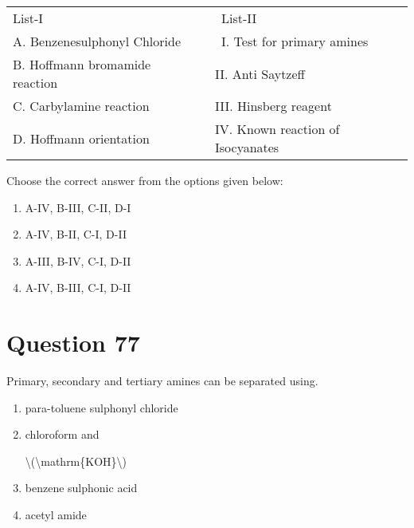 \documentclass{article}
\begin{document}
\begin{longtable}[]{@{}ll@{}}

\toprule\noalign{}

\endhead

\bottomrule\noalign{}

\endlastfoot

List-I~~ & ~List-II~ \\

A. Benzenesulphonyl Chloride & ~I. Test for primary amines~ \\

B. Hoffmann bromamide reaction~~ & II. Anti Saytzeff~~ \\

C. Carbylamine reaction~ & III. Hinsberg reagent~ \\

D. Hoffmann orientation~ & IV. Known reaction of Isocyanates~ \\

\end{longtable}



Choose the correct answer from the options given below:\\


\begin{enumerate}[label=(\alph*)]
\item A-IV, B-III, C-II, D-I


\item A-IV, B-II, C-I, D-II


\item A-III, B-IV, C-I, D-II


\item A-IV, B-III, C-I, D-II


\end{enumerate}
\newpage
\section*{Question 77}
Primary, secondary and tertiary amines can be separated using.


\begin{enumerate}[label=(\alph*)]
\item para-toluene sulphonyl chloride


\item chloroform and

\textbackslash(\textbackslash mathrm\{KOH\}\textbackslash)


\item benzene sulphonic acid


\item acetyl amide


\end{enumerate}
\newpage
\end{document}
